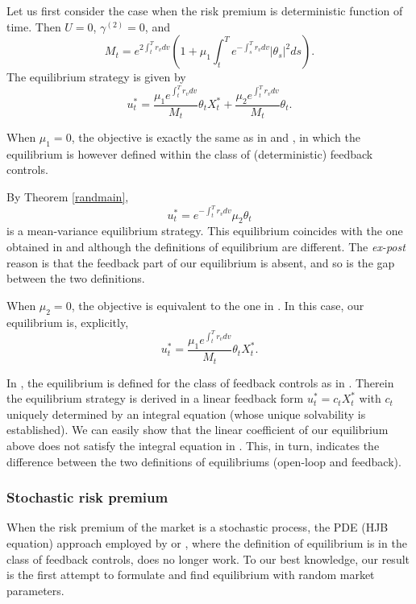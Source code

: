 \documentclass[final]{siamltex}
\begin{document}
Let us first consider the case when the risk premium is deterministic function of time.
Then $U=0$, $\gamma^{(2)}=0$, and
$$M_t=e^{2\int_t^T r_vdv}\left( 1+\mu_1 \int_t^T e^{-\int_s^T r_vdv}|\theta_s|^2ds\right).$$
The equilibrium strategy is given by
$$u^*_t=\frac{\mu_1 e^{\int_t^T r_vdv}}{M_t}\theta_tX_t^*+\frac{\mu_2 e^{\int_t^T r_vdv}}{M_t}\theta_t.$$


When $\mu_1=0$, the objective is exactly the same as in \cite{Basak} and \cite{BM}, in which
the equilibrium is however defined within the class of (deterministic) feedback controls.

By Theorem \ref{randmain},
$$u_t^*=e^{-\int_t^T r_vdv}\mu_2\theta_t$$
is a mean-variance equilibrium strategy.
This equilibrium coincides with the one obtained in \cite{Basak} and \cite{BM} although
the definitions of equilibrium are different. The {\it ex-post}  reason is that the feedback part
of our  equilibrium is absent, and so is the gap between the two definitions.

\bigskip


When $\mu_2=0$, the objective is equivalent to the one in \cite{BMZ}. In this case,
our equilibrium is, explicitly,
$$u_t^*=\frac{\mu_1e^{\int_t^T r_vdv}}{M_t}\theta_t X_t^*.$$

In \cite{BMZ}, the equilibrium is defined for the class of feedback controls as in \cite{BM}. Therein the
equilibrium strategy is derived in a linear feedback form $u^*_t=c_tX^*_t$ with $c_t$ uniquely determined by an integral equation (whose unique solvability
is established). We can easily show that the linear coefficient of our equilibrium above does not satisfy the integral equation
in \cite{BMZ}. This, in turn, indicates the difference between the two definitions of  equilibriums (open-loop and feedback).

\subsubsection{Stochastic risk premium}

When the risk premium  of the market is a stochastic process, the PDE (HJB equation) approach employed by \cite{BM} or \cite{BMZ}, where
the definition of equilibrium is in the class of feedback controls, does no longer work.
To our best knowledge,
our result is the first attempt to formulate and find equilibrium with random market parameters.
\end{document}
